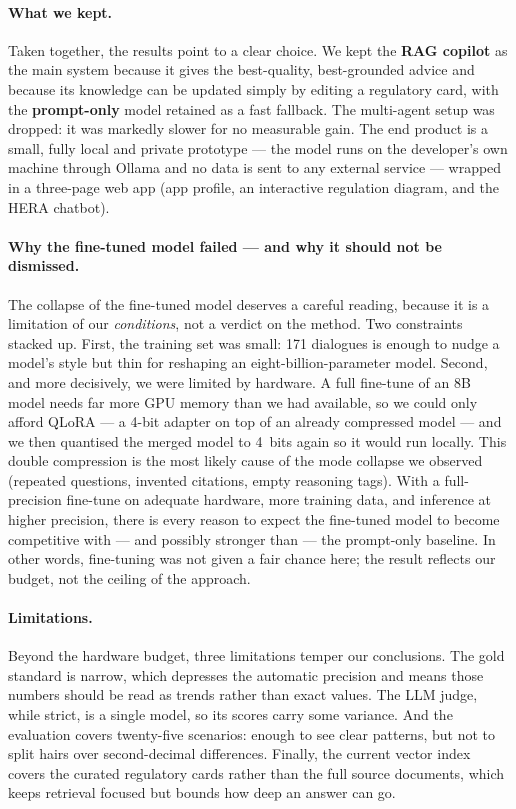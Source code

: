 \documentclass[11pt]{article}
\begin{document}
\paragraph{What we kept.}
Taken together, the results point to a clear choice. We kept the \textbf{RAG copilot} as
the main system because it gives the best-quality, best-grounded advice and because its
knowledge can be updated simply by editing a regulatory card, with the \textbf{prompt-only}
model retained as a fast fallback. The multi-agent setup was dropped: it was markedly
slower for no measurable gain. The end product is a small, fully local and private
prototype --- the model runs on the developer's own machine through Ollama and no data is
sent to any external service --- wrapped in a three-page web app (app profile, an
interactive regulation diagram, and the HERA chatbot).

\paragraph{Why the fine-tuned model failed --- and why it should not be dismissed.}
The collapse of the fine-tuned model deserves a careful reading, because it is a
limitation of our \emph{conditions}, not a verdict on the method. Two constraints stacked
up. First, the training set was small: 171 dialogues is enough to nudge a model's style
but thin for reshaping an eight-billion-parameter model. Second, and more decisively, we
were limited by hardware. A full fine-tune of an 8B model needs far more GPU memory than
we had available, so we could only afford QLoRA --- a 4-bit adapter on top of an already
compressed model --- and we then quantised the merged model to 4~bits again so it would
run locally. This double compression is the most likely cause of the mode collapse we
observed (repeated questions, invented citations, empty reasoning tags). With a full-
precision fine-tune on adequate hardware, more training data, and inference at higher
precision, there is every reason to expect the fine-tuned model to become competitive with
--- and possibly stronger than --- the prompt-only baseline. In other words, fine-tuning
was not given a fair chance here; the result reflects our budget, not the ceiling of the
approach.

\paragraph{Limitations.}
Beyond the hardware budget, three limitations temper our conclusions. The gold standard is
narrow, which depresses the automatic precision and means those numbers should be read as
trends rather than exact values. The LLM judge, while strict, is a single model, so its
scores carry some variance. And the evaluation covers twenty-five scenarios: enough to see
clear patterns, but not to split hairs over second-decimal differences. Finally, the
current vector index covers the curated regulatory cards rather than the full source
documents, which keeps retrieval focused but bounds how deep an answer can go.
\end{document}
